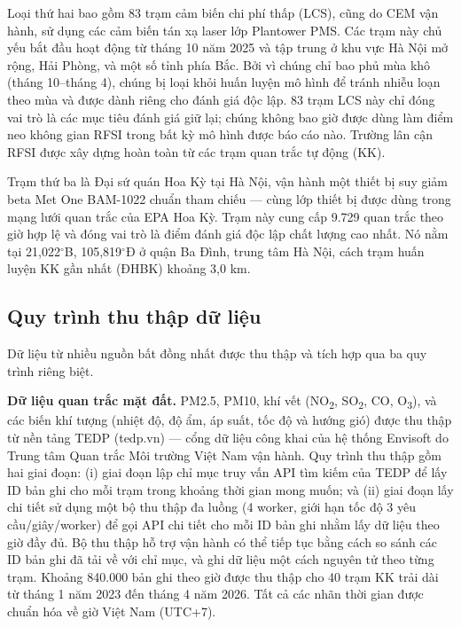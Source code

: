 Loại thứ hai bao gồm 83 trạm cảm biến chi phí thấp (LCS), cũng do CEM vận hành, sử dụng các cảm biến tán xạ laser lớp Plantower PMS. Các trạm này chủ yếu bắt đầu hoạt động từ tháng 10 năm 2025 và tập trung ở khu vực Hà Nội mở rộng, Hải Phòng, và một số tỉnh phía Bắc. Bởi vì chúng chỉ bao phủ mùa khô (tháng 10--tháng 4), chúng bị loại khỏi huấn luyện mô hình để tránh nhiễu loạn theo mùa và được dành riêng cho đánh giá độc lập. 83 trạm LCS này chỉ đóng vai trò là các mục tiêu đánh giá giữ lại; chúng không bao giờ được dùng làm điểm neo không gian RFSI trong bất kỳ mô hình được báo cáo nào. Trường lân cận RFSI được xây dựng hoàn toàn từ các trạm quan trắc tự động (KK).

Trạm thứ ba là Đại sứ quán Hoa Kỳ tại Hà Nội, vận hành một thiết bị suy giảm beta Met One BAM-1022 chuẩn tham chiếu --- cùng lớp thiết bị được dùng trong mạng lưới quan trắc của EPA Hoa Kỳ. Trạm này cung cấp 9.729 quan trắc theo giờ hợp lệ và đóng vai trò là điểm đánh giá độc lập chất lượng cao nhất. Nó nằm tại 21,022$^\circ$B, 105,819$^\circ$Đ ở quận Ba Đình, trung tâm Hà Nội, cách trạm huấn luyện KK gần nhất (ĐHBK) khoảng 3,0 km.

\subsection{Quy trình thu thập dữ liệu}

Dữ liệu từ nhiều nguồn bất đồng nhất được thu thập và tích hợp qua ba quy trình riêng biệt.

\textbf{Dữ liệu quan trắc mặt đất.} PM2.5, PM10, khí vết (NO\textsubscript{2}, SO\textsubscript{2}, CO, O\textsubscript{3}), và các biến khí tượng (nhiệt độ, độ ẩm, áp suất, tốc độ và hướng gió) được thu thập từ nền tảng TEDP (tedp.vn) --- cổng dữ liệu công khai của hệ thống Envisoft do Trung tâm Quan trắc Môi trường Việt Nam vận hành. Quy trình thu thập gồm hai giai đoạn: (i) giai đoạn lập chỉ mục truy vấn API tìm kiếm của TEDP để lấy ID bản ghi cho mỗi trạm trong khoảng thời gian mong muốn; và (ii) giai đoạn lấy chi tiết sử dụng một bộ thu thập đa luồng (4 worker, giới hạn tốc độ 3 yêu cầu/giây/worker) để gọi API chi tiết cho mỗi ID bản ghi nhằm lấy dữ liệu theo giờ đầy đủ. Bộ thu thập hỗ trợ vận hành có thể tiếp tục bằng cách so sánh các ID bản ghi đã tải về với chỉ mục, và ghi dữ liệu một cách nguyên tử theo từng trạm. Khoảng 840.000 bản ghi theo giờ được thu thập cho 40 trạm KK trải dài từ tháng 1 năm 2023 đến tháng 4 năm 2026. Tất cả các nhãn thời gian được chuẩn hóa về giờ Việt Nam (UTC+7).

